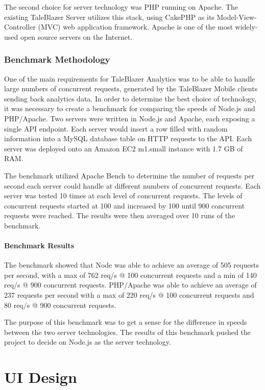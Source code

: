 The second choice for server technology was PHP running on Apache. The existing TaleBlazer Server utilizes this stack, using CakePHP as its Model-View-Controller (MVC) web application framework. Apache is one of the most widely-used open source servers on the Internet.

\subsubsection{Benchmark Methodology}

One of the main requirements for TaleBlazer Analytics was to be able to handle large numbers of concurrent requests, generated by the TaleBlazer Mobile clients sending back analytics data. In order to determine the best choice of technology, it was necessary to create a benchmark for comparing the speeds of Node.js and PHP/Apache. Two servers were written in Node.js and Apache, each exposing a single API endpoint. Each server would insert a row filled with random information into a MySQL database table on HTTP requests to the API. 
Each server was deployed onto an Amazon EC2 m1.small instance with 1.7 GB of RAM. 

The benchmark utilized Apache Bench to determine the number of requests per second each server could handle at different numbers of concurrent requests. Each server was tested 10 times at each level of concurrent requests. The levels of concurrent requests started at 100 and increased by 100 until 900 concurrent requests were reached. The results were then averaged over 10 runs of the benchmark.

\paragraph{Benchmark Results}

The benchmark showed that Node was able to achieve an average of 505 requests per second, with a max of 762 req/s @ 100 concurrent requests and a min of 140 req/s @ 900 concurrent requests. PHP/Apache was able to achieve an average of 237 requests per second with a max of 220 req/s @ 100 concurrent requests and 80 req/s @ 900 concurrent requests. 

The purpose of this benchmark was to get a sense for the difference in speeds between the two server technologies. The results of this benchmark pushed the project to decide on Node.js as the server technology.

\section{UI Design}

